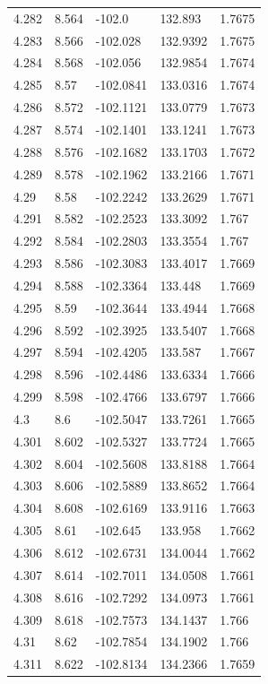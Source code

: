 \begin{tabular}{lllll}
4.282 & 8.564 & -102.0 & 132.893 & 1.7675 \\
4.283 & 8.566 & -102.028 & 132.9392 & 1.7675 \\
4.284 & 8.568 & -102.056 & 132.9854 & 1.7674 \\
4.285 & 8.57 & -102.0841 & 133.0316 & 1.7674 \\
4.286 & 8.572 & -102.1121 & 133.0779 & 1.7673 \\
4.287 & 8.574 & -102.1401 & 133.1241 & 1.7673 \\
4.288 & 8.576 & -102.1682 & 133.1703 & 1.7672 \\
4.289 & 8.578 & -102.1962 & 133.2166 & 1.7671 \\
4.29 & 8.58 & -102.2242 & 133.2629 & 1.7671 \\
4.291 & 8.582 & -102.2523 & 133.3092 & 1.767 \\
4.292 & 8.584 & -102.2803 & 133.3554 & 1.767 \\
4.293 & 8.586 & -102.3083 & 133.4017 & 1.7669 \\
4.294 & 8.588 & -102.3364 & 133.448 & 1.7669 \\
4.295 & 8.59 & -102.3644 & 133.4944 & 1.7668 \\
4.296 & 8.592 & -102.3925 & 133.5407 & 1.7668 \\
4.297 & 8.594 & -102.4205 & 133.587 & 1.7667 \\
4.298 & 8.596 & -102.4486 & 133.6334 & 1.7666 \\
4.299 & 8.598 & -102.4766 & 133.6797 & 1.7666 \\
4.3 & 8.6 & -102.5047 & 133.7261 & 1.7665 \\
4.301 & 8.602 & -102.5327 & 133.7724 & 1.7665 \\
4.302 & 8.604 & -102.5608 & 133.8188 & 1.7664 \\
4.303 & 8.606 & -102.5889 & 133.8652 & 1.7664 \\
4.304 & 8.608 & -102.6169 & 133.9116 & 1.7663 \\
4.305 & 8.61 & -102.645 & 133.958 & 1.7662 \\
4.306 & 8.612 & -102.6731 & 134.0044 & 1.7662 \\
4.307 & 8.614 & -102.7011 & 134.0508 & 1.7661 \\
4.308 & 8.616 & -102.7292 & 134.0973 & 1.7661 \\
4.309 & 8.618 & -102.7573 & 134.1437 & 1.766 \\
4.31 & 8.62 & -102.7854 & 134.1902 & 1.766 \\
4.311 & 8.622 & -102.8134 & 134.2366 & 1.7659 \\

\end{tabular}
